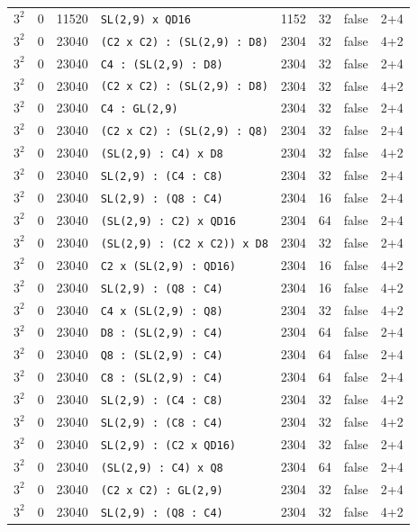 \begin{longtable}{llrlrrll}
$3^2$ & 0 & 11520 & \texttt{SL(2,9) x QD16} & 1152 & 32 & false & 2+4\\
$3^2$ & 0 & 23040 & \texttt{(C2 x C2) : (SL(2,9) : D8)} & 2304 & 32 & false & 4+2\\
$3^2$ & 0 & 23040 & \texttt{C4 : (SL(2,9) : D8)} & 2304 & 32 & false & 2+4\\
$3^2$ & 0 & 23040 & \texttt{(C2 x C2) : (SL(2,9) : D8)} & 2304 & 32 & false & 4+2\\
$3^2$ & 0 & 23040 & \texttt{C4 : GL(2,9)} & 2304 & 32 & false & 2+4\\
$3^2$ & 0 & 23040 & \texttt{(C2 x C2) : (SL(2,9) : Q8)} & 2304 & 32 & false & 2+4\\
$3^2$ & 0 & 23040 & \texttt{(SL(2,9) : C4) x D8} & 2304 & 32 & false & 4+2\\
$3^2$ & 0 & 23040 & \texttt{SL(2,9) : (C4 : C8)} & 2304 & 32 & false & 2+4\\
$3^2$ & 0 & 23040 & \texttt{SL(2,9) : (Q8 : C4)} & 2304 & 16 & false & 2+4\\
$3^2$ & 0 & 23040 & \texttt{(SL(2,9) : C2) x QD16} & 2304 & 64 & false & 2+4\\
$3^2$ & 0 & 23040 & \texttt{(SL(2,9) : (C2 x C2)) x D8} & 2304 & 32 & false & 2+4\\
$3^2$ & 0 & 23040 & \texttt{C2 x (SL(2,9) : QD16)} & 2304 & 16 & false & 4+2\\
$3^2$ & 0 & 23040 & \texttt{SL(2,9) : (Q8 : C4)} & 2304 & 16 & false & 4+2\\
$3^2$ & 0 & 23040 & \texttt{C4 x (SL(2,9) : Q8)} & 2304 & 32 & false & 4+2\\
$3^2$ & 0 & 23040 & \texttt{D8 : (SL(2,9) : C4)} & 2304 & 64 & false & 2+4\\
$3^2$ & 0 & 23040 & \texttt{Q8 : (SL(2,9) : C4)} & 2304 & 64 & false & 2+4\\
$3^2$ & 0 & 23040 & \texttt{C8 : (SL(2,9) : C4)} & 2304 & 64 & false & 2+4\\
$3^2$ & 0 & 23040 & \texttt{SL(2,9) : (C4 : C8)} & 2304 & 32 & false & 4+2\\
$3^2$ & 0 & 23040 & \texttt{SL(2,9) : (C8 : C4)} & 2304 & 32 & false & 4+2\\
$3^2$ & 0 & 23040 & \texttt{SL(2,9) : (C2 x QD16)} & 2304 & 32 & false & 2+4\\
$3^2$ & 0 & 23040 & \texttt{(SL(2,9) : C4) x Q8} & 2304 & 64 & false & 2+4\\
$3^2$ & 0 & 23040 & \texttt{(C2 x C2) : GL(2,9)} & 2304 & 32 & false & 2+4\\
$3^2$ & 0 & 23040 & \texttt{SL(2,9) : (Q8 : C4)} & 2304 & 32 & false & 4+2\\

\end{longtable}
